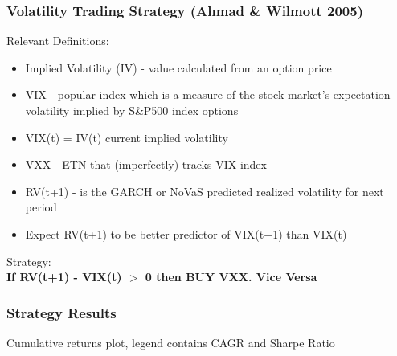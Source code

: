 \documentclass{beamer}
\begin{document}
\begin{frame}
\frametitle{Volatility Trading Strategy (Ahmad \& Wilmott 2005)}
\vspace{-2pt}
Relevant Definitions:
\begin{itemize}
\item{Implied Volatility (IV) - value calculated from an option price}
\vspace{2pt}
\item{VIX - popular index which is a measure of the stock market's expectation volatility implied by S\&P500 index options}
\vspace{2pt}
\item{VIX(t) = IV(t) current implied volatility}
\vspace{2pt}
\item{VXX - ETN that (imperfectly) tracks VIX index}
\vspace{2pt}
\item{RV(t+1) - is the GARCH or NoVaS predicted realized volatility for next period}
\vspace{2pt}
\item{Expect RV(t+1) to be better predictor of VIX(t+1) than VIX(t)}
\end{itemize}
\vspace{2pt}
Strategy:\\
\vspace{2pt}
\hspace{10pt}\textbf{If RV(t+1) - VIX(t) $>$ 0 then BUY VXX. Vice Versa}
\end{frame}

\begin{frame}
\frametitle{Strategy Results}
Cumulative returns plot, legend contains CAGR and Sharpe Ratio
\end{frame}
\end{document}
